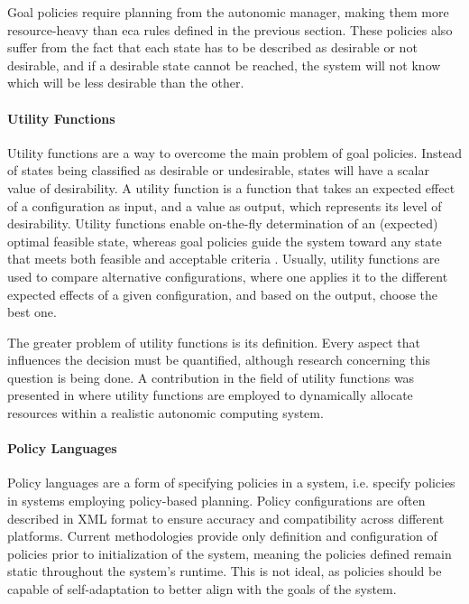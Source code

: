 Goal policies require planning from the autonomic manager, making them more resource-heavy than \gls{eca} rules defined in the previous section. These policies also suffer from the fact that each state has to be described as desirable or not desirable, and if a desirable state cannot be reached, the system will not know which will be less desirable than the other.
%
%
%
\paragraph{Utility Functions}
\label{par:utilityfunctions}

Utility functions are a way to overcome the main problem of goal policies. Instead of states being classified as desirable or undesirable, states will have a scalar value of desirability. A utility function is a function that takes an expected effect of a configuration as input, and a value as output, which represents its level of desirability. Utility functions enable on-the-fly determination of an (expected) optimal feasible state, whereas goal policies guide the system toward any state that meets both feasible and acceptable criteria \cite{Walsh2004}. Usually, utility functions are used to compare alternative  configurations, where one applies it to the different expected effects of a given configuration, and based on the output, choose the best one.

The greater problem of utility functions is its definition. Every aspect that influences the decision must be quantified, although research concerning this question is being done. A contribution in the field of utility functions was presented in \cite{Walsh2004} where utility functions are employed to dynamically allocate resources within a realistic autonomic computing system.
%
%
%
\paragraph{Policy Languages}
\label{par:policylanguages}

Policy languages are a form of specifying policies in a system, i.e. specify policies in systems employing policy-based planning. Policy configurations are often described in XML format to ensure accuracy and compatibility across different platforms. Current methodologies provide only definition and configuration of policies prior to initialization of the system, meaning the policies defined remain static throughout the system's runtime. This is not ideal, as policies should be capable of self-adaptation to better align with the goals of the system\cite{Anthony2006}.

